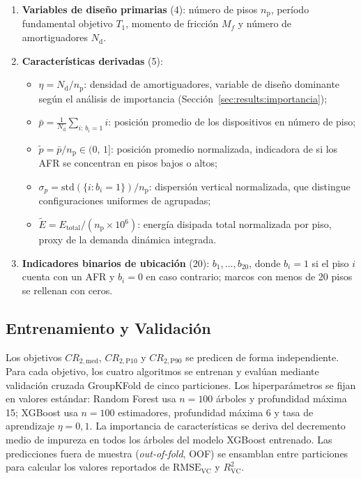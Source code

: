 \documentclass[preprint,12pt,authoryear]{elsarticle}
\newcommand{\CR}[1]{CR_{2,\text{#1}}}
\newcommand{\RMSE}{\mathrm{RMSE_{VC}}}       %
\newcommand{\Rsq}{R^{2}_{\mathrm{VC}}}
\newcommand{\nd}{N_{\mathrm{d}}}
\newcommand{\np}{n_{\mathrm{p}}}              %
\newcommand{\etad}{\eta}
\newcommand{\Mf}{M_{\!f}}
\begin{document}
\begin{enumerate}[label=\textit{\roman*})]
    \item \textbf{Variables de diseño primarias} (4):
          número de pisos $\np$, período fundamental objetivo $T_1$,
          momento de fricción $\Mf$ y número de amortiguadores $\nd$.

    \item \textbf{Características derivadas} (5):
    \begin{itemize}
        \item $\etad = \nd/\np$: densidad de amortiguadores, variable de
              diseño dominante según el análisis de importancia
              (Sección~\ref{sec:results:importancia});
        \item $\bar{p} = \tfrac{1}{\nd}\sum_{i:\,b_i=1} i$: posición
              promedio de los dispositivos en número de piso;
        \item $\tilde{p} = \bar{p}/\np \in (0,\,1]$: posición promedio
              normalizada, indicadora de si los AFR se concentran en pisos
              bajos o altos;
        \item $\sigma_p = \mathrm{std}\!\left(\{i:b_i=1\}\right)/\np$:
              dispersión vertical normalizada, que distingue configuraciones
              uniformes de agrupadas;
        \item $\tilde{E} = E_{\mathrm{total}}/(\np\times10^6)$: energía
              disipada total normalizada por piso, proxy de la demanda
              dinámica integrada.
    \end{itemize}

    \item \textbf{Indicadores binarios de ubicación} (20):
          $b_1,\ldots,b_{20}$, donde $b_i=1$ si el piso $i$ cuenta con
          un AFR y $b_i=0$ en caso contrario; marcos con menos de 20 pisos
          se rellenan con ceros.
\end{enumerate}

\subsection{Entrenamiento y Validación}
\label{sec:method:entrenamiento}

Los objetivos $\CR{med}$, $\CR{P10}$ y $\CR{P90}$ se predicen de forma
independiente. Para cada objetivo, los cuatro algoritmos se entrenan y evalúan
mediante validación cruzada GroupKFold de cinco particiones. Los
hiperparámetros se fijan en valores estándar: Random Forest usa $n=100$ árboles
y profundidad máxima 15; XGBoost usa $n=100$ estimadores, profundidad máxima 6
y tasa de aprendizaje $\eta=0{,}1$. La importancia de características se deriva
del decremento medio de impureza en todos los árboles del modelo XGBoost
entrenado. Las predicciones fuera de muestra (\textit{out-of-fold}, OOF) se
ensamblan entre particiones para calcular los valores reportados de $\RMSE$ y
$\Rsq$.
\end{document}
